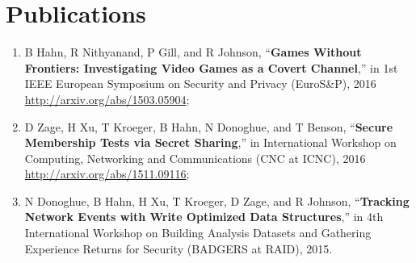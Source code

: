 \documentclass[11pt,a4paper,sans]{moderncv}        %
\begin{document}
\section{Publications}
\begin{enumerate}
	\item  B Hahn, R Nithyanand, P Gill, and R Johnson, “\textbf{Games Without Frontiers: Investigating Video Games as a Covert Channel},” in 1st IEEE European Symposium on Security and Privacy (EuroS\&P), 2016 \\ \url{http://arxiv.org/abs/1503.05904};
	\item D Zage, H Xu, T Kroeger, B Hahn, N Donoghue, and T Benson, “\textbf{Secure Membership Tests via Secret Sharing},” in International Workshop on Computing, Networking and Communications (CNC at ICNC), 2016 \\
	\url{http://arxiv.org/abs/1511.09116};
	\item N Donoghue, B Hahn, H Xu, T Kroeger, D Zage, and R Johnson, “\textbf{Tracking Network Events with Write Optimized Data Structures},” in 4th International Workshop on Building Analysis Datasets and Gathering Experience Returns for Security (BADGERS at RAID), 2015.
\end{enumerate}
\end{document}
